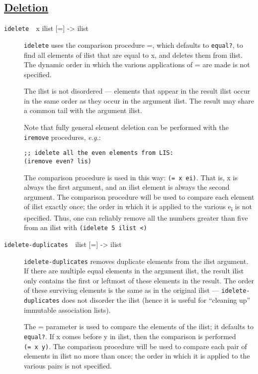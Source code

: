 \subsection{\texorpdfstring{\href{}{Deletion}}{Deletion}}\label{deletion}

\begin{description}
\item[ \href{}{} \texttt{idelete~~}x ilist {[}={]} -\textgreater{} ilist
]
\texttt{idelete} uses the comparison procedure =, which defaults to
\texttt{equal?}, to find all elements of ilist that are equal to x, and
deletes them from ilist. The dynamic order in which the various
applications of = are made is not specified.

The ilist is not disordered --- elements that appear in the result ilist
occur in the same order as they occur in the argument ilist. The result
may share a common tail with the argument ilist.

Note that fully general element deletion can be performed with the
\texttt{iremove} procedures, \emph{e.g.}:

\begin{verbatim}
;; idelete all the even elements from LIS:
(iremove even? lis)
\end{verbatim}

The comparison procedure is used in this way: \texttt{(=\ x\ ei)}. That
is, x is always the first argument, and an ilist element is always the
second argument. The comparison procedure will be used to compare each
element of ilist exactly once; the order in which it is applied to the
various e\textsubscript{i} is not specified. Thus, one can reliably
remove all the numbers greater than five from an ilist with
\texttt{(idelete\ 5\ ilist\ \textless{})}
\item[ \href{}{} \texttt{idelete-duplicates~~}ilist {[}={]}
-\textgreater{} ilist ]
\texttt{idelete-duplicates} removes duplicate elements from the ilist
argument. If there are multiple equal elements in the argument ilist,
the result ilist only contains the first or leftmost of these elements
in the result. The order of these surviving elements is the same as in
the original ilist --- \texttt{idelete-duplicates} does not disorder the
ilist (hence it is useful for ``cleaning up'' immutable association
lists).

The = parameter is used to compare the elements of the ilist; it
defaults to \texttt{equal?}. If x comes before y in ilist, then the
comparison is performed \texttt{(=\ x\ y)}. The comparison procedure
will be used to compare each pair of elements in ilist no more than
once; the order in which it is applied to the various pairs is not
specified.


\end{description}
